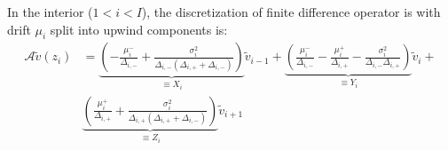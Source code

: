 \documentclass[11pt]{article}
\begin{document}
In the interior ($1 < i < I$), the discretization of finite difference operator is with drift $\mu_i$ split into upwind components is:
\begin{align}
\mathcal{A} \tilde{v}(z_i) 
&= \underbrace{\left(-\frac{\mu_i^{-}}{\Delta_{i,-}} +\frac{\sigma_i^2}{\Delta_{i,-}(\Delta_{i,+}+\Delta_{i,-})}\right)}_{\equiv X_i}\tilde{v}_{i-1} + \underbrace{\left(\frac{\mu_i^{-}}{\Delta_{i,-}} - \frac{\mu_i^{+}}{\Delta_{i,+}}-\frac{\sigma_i^2}{\Delta_{i,-}\Delta_{i,+}}\right)}_{\equiv Y_i}\tilde{v}_i +\nonumber\\ &\underbrace{\left(\frac{\mu_i^{+}}{\Delta_{i,+}} + \frac{\sigma_i^2}{\Delta_{i,+}(\Delta_{i,+}+\Delta_{i,-})}\right)}_{\equiv Z_i}\tilde{v}_{i+1}\label{eq:A-collected-interior-with-nonuniform-grid}
\end{align}
\end{document}
